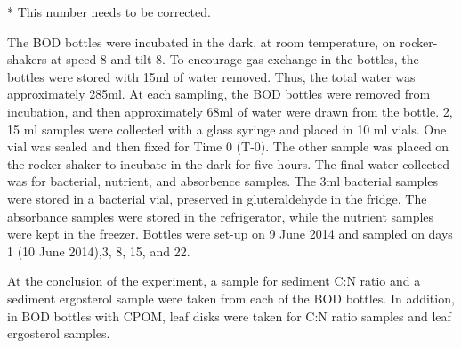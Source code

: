 * This number needs to be corrected.

The BOD bottles were incubated in the dark, at room temperature, on rocker-shakers at speed 8 and tilt 8. To encourage gas exchange in the bottles, the bottles were stored with 15ml of water removed. Thus, the total water was approximately 285ml. At each sampling, the BOD bottles were removed from incubation, and then approximately 68ml of water were drawn from the bottle. 2, 15 ml samples were collected with a glass syringe and placed in 10 ml vials. One vial was sealed and then fixed for Time 0 (T-0). The other sample was placed on the rocker-shaker to incubate in the dark for five hours. The final water collected was for bacterial, nutrient, and absorbence samples. The 3ml  bacterial samples were stored in a bacterial vial, preserved in gluteraldehyde in the fridge. The absorbance samples were stored in the refrigerator, while the nutrient samples were kept in the freezer. Bottles were set-up on 9 June 2014 and sampled on days 1 (10 June 2014),3, 8, 15, and 22.

At the conclusion of the experiment, a sample for sediment C:N ratio and a sediment ergosterol sample were taken from each of the BOD bottles. In addition, in BOD bottles with CPOM, leaf disks were taken for C:N ratio samples and leaf ergosterol samples. 
